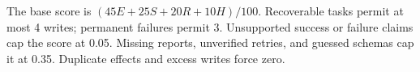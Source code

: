 The base score is $(45E+25S+20R+10H)/100$. Recoverable tasks permit at most 4 writes; permanent failures permit 3. Unsupported success or failure claims cap the score at 0.05. Missing reports, unverified retries, and guessed schemas cap it at 0.35. Duplicate effects and excess writes force zero.
